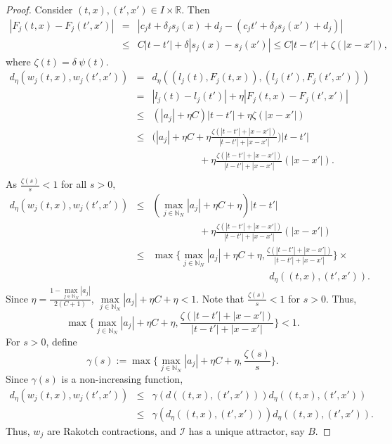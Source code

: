 \documentclass[sn-mathphys-num]{sn-jnl}
\numberwithin{equation}{section}
\begin{document}
\begin{proof}
Consider $(t,x),(t',x') \in I\times\mathbb{R}$. Then
\begin{eqnarray*}
    |F_j(t,x)-F_j(t',x')|&=&|c_jt+\delta_js_j(x)+d_j-(c_jt'+\delta_js_j(x')+d_j)|\\
    &\leq&C|t-t'|+\delta|s_j(x)-s_j(x')|\leq C|t-t'|+\zeta(|x-x'|),
\end{eqnarray*}
where $\zeta(t)=\delta~\psi(t)$.
\begin{eqnarray*}
d_\eta(w_j(t,x),w_j(t',x'))&=& d_\eta((l_j(t),F_j(t,x)),(l_j(t'),F_j(t',x')))\\
&=& |l_j(t)-l_j(t')|+\eta|F_j(t,x)-F_j(t',x')|\\
&\leq&(|a_j|+\eta C)|t-t'|+\eta\zeta(|x-x'|)\\
&\leq&\bigg(|a_j|+\eta C+\eta\frac{\zeta(|t-t'|+|x-x'|)}{|t-t'|+|x-x'|}\bigg)|t-t'|\\
& &\hspace{2cm}+\eta\frac{\zeta(|t-t'|+|x-x'|)}{|t-t'|+|x-x'|}(|x-x'|).\\
\end{eqnarray*}
As $\frac{\zeta(s)}{s}<1 $ for all $ 
s>0,$
\begin{eqnarray*}
d_\eta(w_j(t,x),w_j(t',x'))&\leq&(\max\limits_{j\in\mathbb N_N} |a_j|+\eta C+\eta)|t-t'| \\
& &\hspace{2cm}+\eta\frac{\zeta(|t-t'|+|x-x'|)}{|t-t'|+|x-x'|}(|x-x'|)\\
&\leq&\max\{\max\limits_{j\in\mathbb N_N
} |a_j|+\eta C+\eta,\frac{\zeta(|t-t'|+|x-x'|)}{|t-t'|+|x-x'|}\} \times \\
& &\hspace{5cm} d_\eta((t,x),(t',x')).
\end{eqnarray*}
 Since $\eta=\frac{1-\max\limits_{j\in\mathbb N_N}|a_j|}{2(C+1)}$, $\max\limits_{j\in\mathbb N_N}|a_j|+\eta C+\eta<1$. Note that $\frac{\zeta(s)}{s}<1$ for $s>0$. Thus,
\begin{equation*}
\max\{\max\limits_{j\in\mathbb N_N} |a_j|+\eta C+\eta,\frac{\zeta(|t-t'|+|x-x'|)}{|t-t'|+|x-x'|}\}<1.
\end{equation*}
For $s>0$, define
\begin{equation*}
\gamma(s):=\max\{\max\limits_{j\in\mathbb N_N} |a_j|+\eta C+\eta,\frac{\zeta(s)}{s}\}.
\end{equation*}
Since $\gamma(s)$ is a non-increasing function,
\begin{eqnarray*}
d_\eta(w_j(t,x),w_j(t',x'))&\leq& \gamma(d((t,x),(t',x')))d_\eta((t,x),(t',x'))\\
&\leq&\gamma(d_\eta((t,x),(t',x')))d_\eta((t,x),(t',x')).
\end{eqnarray*}
Thus, $w_j$ are Rakotch contractions, and $\mathcal{I}$ has a unique attractor, say $B$.


\end{proof}
\end{document}
